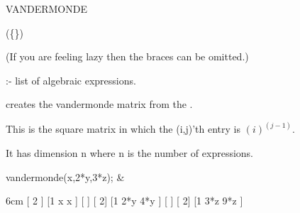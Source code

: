 \begin{Operator}[vandermonde]{VANDERMONDE}

\begin{Syntax}  
(\{\})  
\end{Syntax}
(If you are feeling lazy then the braces can be omitted.)

 :- list of algebraic expressions.

 creates the vandermonde matrix from the 
.

This is the square matrix in which the (i,j)'th entry is 
$(i)^(j-1)$.

It has dimension n where n is the number of expressions.

         
\begin{Examples}             
vandermonde({x,2*y,3*z}); &
\begin{multilineoutput}{6cm}
[          2 ]
[1   x    x  ]
[            ]
[           2]
[1  2*y  4*y ]
[            ]
[           2]
[1  3*z  9*z ]
\end{multilineoutput}

\end{Examples}

\end{Operator}

